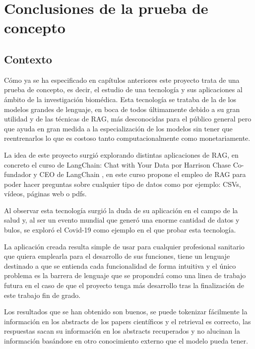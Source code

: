 
\section{Conclusiones de la prueba de concepto}

\subsection{Contexto}

Cómo ya se ha especificado en capítulos anteriores este proyecto trata de una prueba de concepto, es decir, el estudio de una tecnología y sus aplicaciones al ámbito de la investigación biomédica. Esta tecnología se trataba de la de los modelos grandes de lenguaje, en boca de todos últimamente debido a su gran utilidad y de las técnicas de RAG, más desconocidas para el público general pero que ayuda en gran medida a la especialización de los modelos sin tener que reentrenarlos lo que es costoso tanto computacionalmente como monetariamente.

La idea de este proyecto surgió explorando distintas aplicaciones de RAG, en concreto el curso de LangChain: Chat with Your Data por Harrison Chase Co-fundador y CEO de LangChain \cite{harrison_chase_langchain}, en este curso propone el empleo de RAG para poder hacer preguntas sobre cualquier tipo de datos como por ejemplo: CSVs, vídeos, páginas web o pdfs.

Al observar esta tecnología surgió la duda de su aplicación en el campo de la salud y, al ser un evento mundial que generó una enorme cantidad de datos y bulos, se exploró el Covid-19 como ejemplo en el que probar esta tecnología.

La aplicación creada resulta simple de usar para cualquier profesional sanitario que quiera emplearla para el desarrollo de sus funciones, tiene un lenguaje destinado a que se entienda cada funcionalidad de forma intuitiva y el único problema es la barrera de lenguaje que se propondrá como una linea de trabajo futura en el caso de que el proyecto tenga más desarrollo tras la finalización de este trabajo fin de grado.

Los resultados que se han obtenido son buenos, se puede tokenizar fácilmente la información en los abstracts de los papers científicos y el retrieval es correcto, las respuestas sacan su información en los abstracts recuperados y no alucinan la información basándose en otro conocimiento externo que el modelo pueda tener. 

